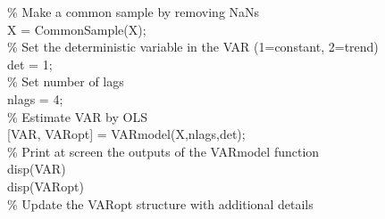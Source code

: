 \hspace{1mm}\hspace{5mm} \hspace{5mm} \textcolor{matlabgreen}{\% Make a common sample by removing NaNs }\\ 
\hspace{1mm}\hspace{5mm} \hspace{5mm} X = CommonSample(X); \\ 
\hspace{1mm}\hspace{5mm} \hspace{5mm} \textcolor{matlabgreen}{\% Set the deterministic variable in the VAR (1=constant, 2=trend) }\\ 
\hspace{1mm}\hspace{5mm} \hspace{5mm} det = 1; \\ 
\hspace{1mm}\hspace{5mm} \hspace{5mm} \textcolor{matlabgreen}{\% Set number of lags }\\ 
\hspace{1mm}\hspace{5mm} \hspace{5mm} nlags = 4; \\ 
\hspace{1mm}\hspace{5mm} \hspace{5mm} \textcolor{matlabgreen}{\% Estimate VAR by OLS }\\ 
\hspace{1mm}\hspace{5mm} \hspace{5mm} [VAR, VARopt] = VARmodel(X,nlags,det); \\ 
\hspace{1mm}\hspace{5mm} \hspace{5mm} \textcolor{matlabgreen}{\% Print at screen the outputs of the VARmodel \textcolor{matlabblue}{function} }\\ 
\hspace{1mm}disp(VAR) \\ 
\hspace{1mm}disp(VARopt) \\ 
\hspace{1mm}\textcolor{matlabgreen}{\% Update the VARopt structure with additional details }\\ 
